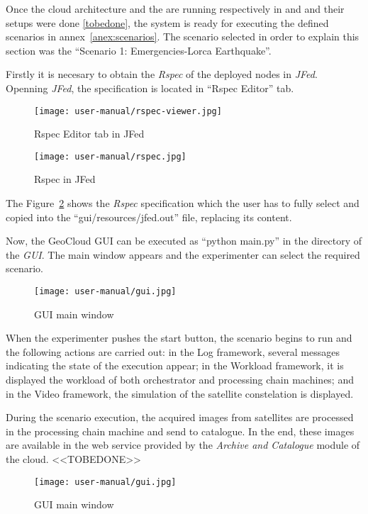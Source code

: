 Once the cloud architecture  and the \sss are running respectively in \bonfire
and \vw and their setups were done \ref{tobedone}, the system is ready for executing the defined scenarios in
annex~\ref{anex:scenarios}. The scenario selected in order to explain this
section was  the ``Scenario 1: Emergencies-Lorca Earthquake''.

Firstly it is necesary to obtain the \emph{Rspec} of the deployed nodes in
\emph{JFed}. Openning \emph{JFed}, the specification is located in ``Rspec
Editor'' tab.

\begin{figure}[!h]
\begin{center}
\texttt{[image: user-manual/rspec-viewer.jpg]}
\caption{Rspec Editor tab in JFed}
\label{fig:rspec-viewer}
\end{center}
\end{figure}


\begin{figure}[!h]
\begin{center}
\texttt{[image: user-manual/rspec.jpg]}
\caption{Rspec in JFed}
\label{fig:rspec}
\end{center}
\end{figure}

The Figure~\ref{fig:rspec} shows the \emph{Rspec} specification which the user
has to fully select and copied into the ``gui/resources/jfed.out'' file,
replacing its content.

Now, the GeoCloud \ac{GUI} can be executed as ``python main.py'' in the
directory of the \emph{GUI}.
The main window appears and the experimenter can select the required scenario.
\begin{figure}[!h]
\begin{center}
\texttt{[image: user-manual/gui.jpg]}
\caption{GUI main window}
\label{fig:gui}
\end{center}
\end{figure}

When the experimenter pushes the start button, the scenario begins to run and
the following actions are carried out: in the Log framework, several messages indicating the state of the execution
appear; in the Workload framework, it is displayed the workload of both orchestrator and
processing chain machines; and in the Video framework, the simulation of the
satellite constelation is displayed.

During the scenario execution, the acquired images from satellites are processed
in the processing chain machine and send to catalogue. In the end, these images are available
in the web service provided by the \emph{Archive and Catalogue} module of the
cloud. 
<<TOBEDONE>>
\begin{figure}[!h]
\begin{center}
\texttt{[image: user-manual/gui.jpg]}
\caption{GUI main window}
\label{fig:images-catalogued}
\end{center}
\end{figure}
